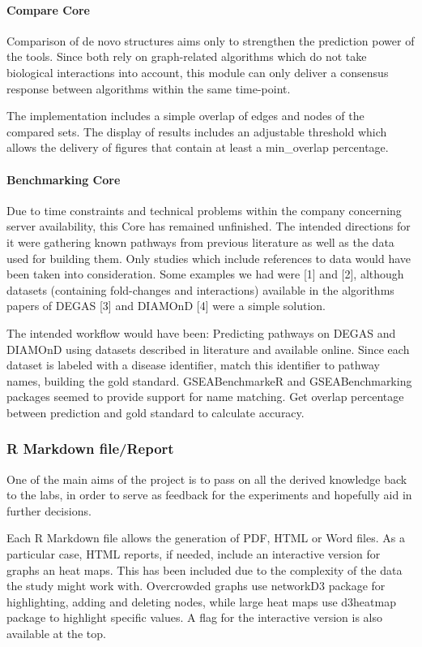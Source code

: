 \paragraph{Compare Core}
Comparison of de novo structures aims only to strengthen the prediction power of the tools. Since both rely on graph-related algorithms which do not take biological interactions into account, this module can only deliver a consensus response between algorithms within the same time-point.


The implementation includes a simple overlap of edges and nodes of the compared sets. The display of results includes an adjustable threshold which allows the delivery of figures that contain at least a min\_overlap percentage.


\paragraph{Benchmarking Core}
Due to time constraints and technical problems within the company concerning server availability, this Core has remained unfinished.
The intended directions for it were gathering known pathways from previous literature as well as the data used for building them. Only studies which include references to data would have been taken into consideration. Some examples we had were [1] and [2], although datasets (containing fold-changes and interactions) available in the algorithms papers of DEGAS [3] and DIAMOnD [4] were a simple solution. 

The intended workflow would have been:
Predicting pathways on DEGAS and DIAMOnD using datasets described in literature and available online.
Since each dataset is labeled with a disease identifier, match this identifier to pathway names, building the gold standard. GSEABenchmarkeR and GSEABenchmarking packages seemed to provide support for name matching.
Get overlap percentage between prediction and gold standard to calculate accuracy.

\subsubsection{R Markdown file/Report}
One of the main aims of the project is to pass on all the derived knowledge back to the labs, in order to serve as feedback for the experiments and hopefully aid in further decisions.

Each R Markdown file allows the generation of PDF, HTML or Word files. As a particular case, HTML reports, if needed, include an interactive version for graphs an heat maps. This has been included due to the complexity of the data the study might work with. Overcrowded graphs use networkD3 package for highlighting, adding and deleting nodes, while large heat maps use d3heatmap package to highlight specific values. A flag for the interactive version is also available at the top.